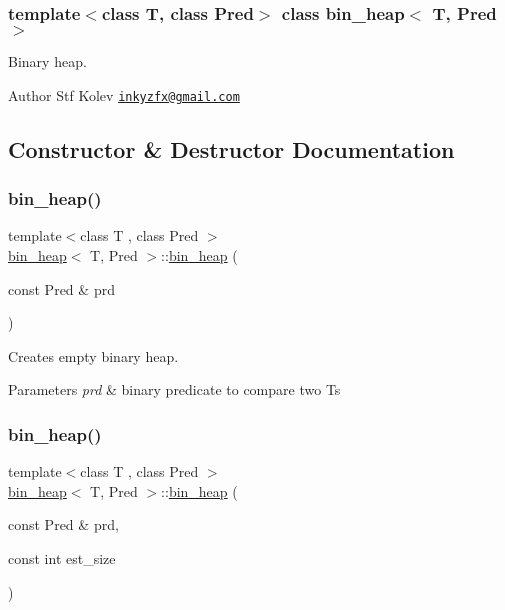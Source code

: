 \subsubsection*{template$<$class T, class Pred$>$\newline
class bin\+\_\+heap$<$ T, Pred $>$}

Binary heap. 

\begin{DoxyAuthor}{Author}
Stf Kolev \href{mailto:inkyzfx@gmail.com}{\tt inkyzfx@gmail.\+com} 
\end{DoxyAuthor}


\subsection{Constructor \& Destructor Documentation}
\mbox{\label{classbin__heap_a9de42b60fac4b0d38aa738522eb7c4cd}} 
\subsubsection{\texorpdfstring{bin\+\_\+heap()}{bin\_heap()}\hspace{0.1cm}{\footnotesize\ttfamily [1/3]}}
{\footnotesize\ttfamily template$<$class T , class Pred $>$ \\
\mbox{\hyperlink{classbin__heap}{bin\+\_\+heap}}$<$ T, Pred $>$\+::\mbox{\hyperlink{classbin__heap}{bin\+\_\+heap}} (\begin{DoxyParamCaption}\item[{const Pred \&}]{prd }\end{DoxyParamCaption})}



Creates empty binary heap. 


\begin{DoxyParams}{Parameters}
{\em prd} & binary predicate to compare two {\ttfamily T}s \\
\hline
\end{DoxyParams}
\mbox{\label{classbin__heap_ab911dd559d9d9fd665b9fdf2d8202bb8}} 
\subsubsection{\texorpdfstring{bin\+\_\+heap()}{bin\_heap()}\hspace{0.1cm}{\footnotesize\ttfamily [2/3]}}
{\footnotesize\ttfamily template$<$class T , class Pred $>$ \\
\mbox{\hyperlink{classbin__heap}{bin\+\_\+heap}}$<$ T, Pred $>$\+::\mbox{\hyperlink{classbin__heap}{bin\+\_\+heap}} (\begin{DoxyParamCaption}\item[{const Pred \&}]{prd,  }\item[{const int}]{est\+\_\+size }\end{DoxyParamCaption})}



